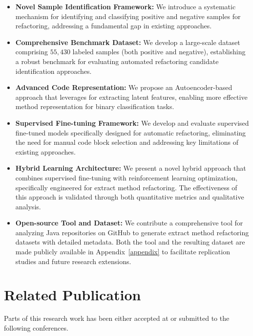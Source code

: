 \begin{itemize}
\item \textbf{Novel Sample Identification Framework:} We introduce a systematic mechanism for identifying and classifying positive and negative samples for \exm{} refactoring, addressing a fundamental gap in existing approaches.

\item \textbf{Comprehensive Benchmark Dataset:} We develop a large-scale dataset comprising $55,430$ labeled samples (both positive and negative), establishing a robust benchmark for evaluating automated refactoring candidate identification approaches.

\item \textbf{Advanced Code Representation:} We propose an Autoencoder-based approach that leverages \GCB{} for extracting latent features, enabling more effective method representation for binary classification tasks.

\item \textbf{Supervised Fine-tuning Framework:} We develop and evaluate supervised fine-tuned models specifically designed for automatic \exm{} refactoring, eliminating the need for manual code block selection and addressing key limitations of existing approaches.

\item \textbf{Hybrid Learning Architecture:} We present a novel hybrid approach that combines supervised fine-tuning with reinforcement learning optimization, specifically engineered for extract method refactoring. The effectiveness of this approach is validated through both quantitative metrics and qualitative analysis.

\item \textbf{Open-source Tool and Dataset:} We contribute a comprehensive tool for analyzing Java repositories on GitHub to generate extract method refactoring datasets with detailed metadata. Both the tool and the resulting dataset are made publicly available in Appendix~\ref{appendix} to facilitate replication studies and future research extensions.

\end{itemize}

\section{Related Publication}

Parts of this research work has been either accepted at or submitted to the following conferences.

